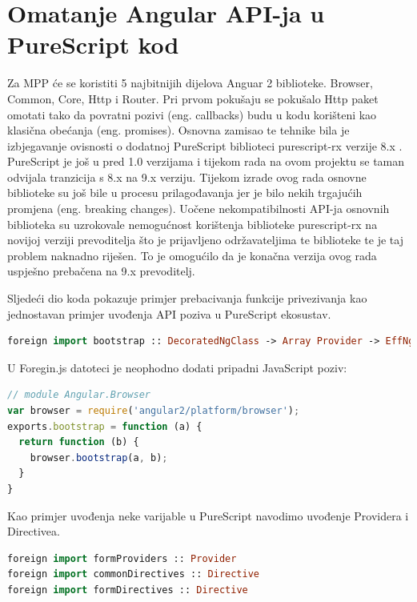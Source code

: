 \documentclass[times, utf8, zavrsni]{fer}
\begin{document}
\section{Omatanje Angular API-ja u PureScript kod}
Za MPP će se koristiti 5 najbitnijih dijelova Anguar 2 biblioteke. Browser, Common, Core, Http i Router.
Pri prvom pokušaju se pokušalo Http paket omotati tako da povratni pozivi (eng. callbacks) budu u kodu korišteni kao klasična obećanja (eng. promises). Osnovna zamisao te tehnike bila je izbjegavanje ovisnosti o dodatnoj PureScript biblioteci purescript-rx verzije 8.x . PureScript je još u pred 1.0 verzijama i tijekom rada na ovom projektu se taman odvijala tranzicija s 8.x na 9.x verziju. Tijekom izrade ovog rada osnovne biblioteke su još bile u procesu prilagođavanja jer je bilo nekih trgajućih promjena (eng. breaking changes). Uočene nekompatibilnosti API-ja osnovnih biblioteka su uzrokovale nemogućnost korištenja biblioteke purescript-rx na novijoj verziji prevoditelja što je prijavljeno održavateljima te biblioteke te je taj problem naknadno riješen. To je omogućilo da je konačna verzija ovog rada uspješno prebačena na 9.x prevoditelj.

Sljedeći dio koda pokazuje primjer prebacivanja funkcije privezivanja kao jednostavan primjer uvođenja API poziva u PureScript ekosustav.

\begin{lstlisting}[language=PureScript, basicstyle=\small\linespread{0.8}]
foreign import bootstrap :: DecoratedNgClass -> Array Provider -> EffNg Unit
\end{lstlisting}

U Foregin.js datoteci je neophodno dodati pripadni JavaScript poziv:

\begin{lstlisting}[language=JavaScript, basicstyle=\small\linespread{0.8}]
// module Angular.Browser
var browser = require('angular2/platform/browser');
exports.bootstrap = function (a) {
  return function (b) {
    browser.bootstrap(a, b);
  }
}
\end{lstlisting}

Kao primjer uvođenja neke varijable u PureScript navodimo uvođenje Providera i Directivea.

\begin{lstlisting}[language=PureScript, basicstyle=\small\linespread{0.8}]
foreign import formProviders :: Provider
foreign import commonDirectives :: Directive
foreign import formDirectives :: Directive
\end{lstlisting}
\end{document}

